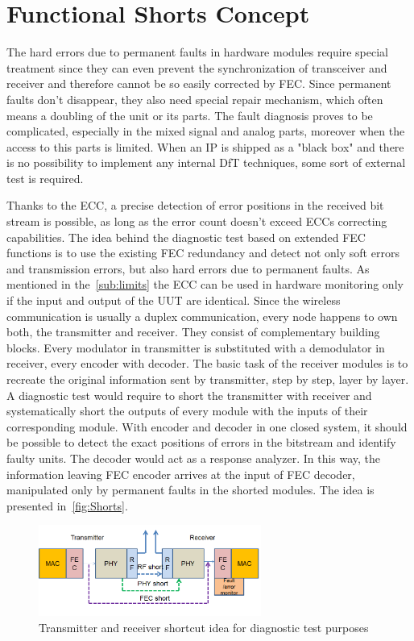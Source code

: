\section{Functional Shorts Concept}\label{sec:shorts}
The hard errors due to permanent faults in hardware modules require special treatment since they can even prevent the synchronization of transceiver and receiver and therefore cannot be so easily corrected by FEC. Since permanent faults don't disappear, they also need special repair mechanism, which often means a doubling of the unit or its parts. The fault diagnosis proves to be complicated, especially in the mixed signal and analog parts, moreover when the access to this parts is limited. When an IP is shipped as a "black box" and there is no possibility to implement any internal DfT techniques, some sort of external test is required. 

Thanks to the ECC, a precise detection of error positions in the received bit stream is possible, as long as the error count doesn't exceed ECCs correcting capabilities. The idea behind the diagnostic test based on extended FEC functions is to use the existing FEC redundancy and detect not only soft errors and transmission errors, but also hard errors due to permanent faults. As mentioned in the~\autoref{sub:limits} the ECC can be used in hardware monitoring only if the input and output of the UUT are identical. Since the wireless communication is usually a duplex communication, every node happens to own both, the transmitter and receiver. They consist of complementary building blocks. Every modulator in transmitter is substituted with a demodulator in receiver, every encoder with decoder. The basic task of the receiver modules is to recreate the original information sent by transmitter, step by step, layer by layer. A diagnostic test would require to short the transmitter with receiver and systematically short the outputs of every module with the inputs of their corresponding module. With encoder and decoder in one closed system, it should be possible to detect the exact positions of errors in the bitstream and identify faulty units. The decoder would act as a response analyzer. In this way, the information leaving FEC encoder arrives at the input of FEC decoder, manipulated only by permanent faults in the shorted modules. The idea is presented in~\autoref{fig:Shorts}. 

\begin{figure}[h]
\centering
\includegraphics[width=0.65\textwidth]{figures/Shorts.png}
\caption{Transmitter and receiver shortcut idea for diagnostic test purposes}
\label{fig:Shorts}
\end{figure}


